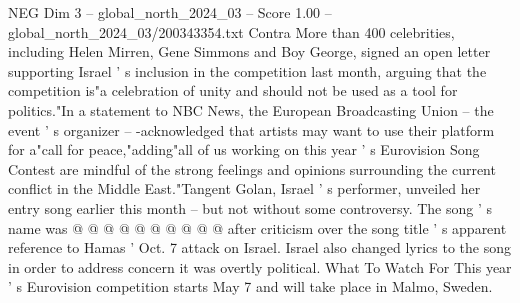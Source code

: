 \begin{textsample}{NEG Dim 3 – global\_north\_2024\_03 – Score 1.00 – global\_north\_2024\_03/200343354.txt}
Contra More than 400 celebrities, including Helen Mirren, Gene Simmons and Boy George, signed an open letter supporting Israel ' s inclusion in the competition last month, arguing that the competition is"a celebration of unity and should not be used as a tool for politics."In a statement to NBC News, the European Broadcasting Union -- the event ' s organizer -- -acknowledged that artists may want to use their platform for a"call for peace,"adding"all of us working on this year ' s Eurovision Song Contest are mindful of the strong feelings and opinions surrounding the current conflict in the Middle East."Tangent Golan, Israel ' s performer, unveiled her entry song earlier this month -- but not without some controversy.
The song ' s name was @ @ @ @ @ @ @ @ @ @ after criticism over the song title ' s apparent reference to Hamas ' Oct. 7 attack on Israel.
Israel also changed lyrics to the song in order to address concern it was overtly political.
What To Watch For This year ' s Eurovision competition starts May 7 and will take place in Malmo, Sweden.

\end{textsample}
